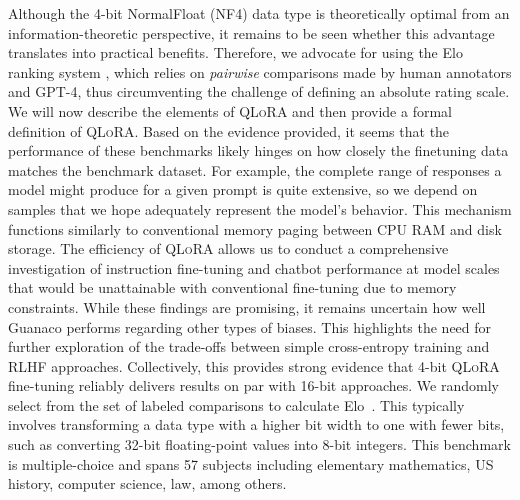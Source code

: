Although the 4-bit NormalFloat (NF4) data type is theoretically optimal from an information-theoretic perspective, it remains to be seen whether this advantage translates into practical benefits. Therefore, we advocate for using the Elo ranking system \citep{elo1967proposed}, which relies on \textit{pairwise} comparisons made by human annotators and GPT-4, thus circumventing the challenge of defining an absolute rating scale. We will now describe the elements of \textsc{QLoRA} and then provide a formal definition of \textsc{QLoRA}. Based on the evidence provided, it seems that the performance of these benchmarks likely hinges on how closely the finetuning data matches the benchmark dataset. For example, the complete range of responses a model might produce for a given prompt is quite extensive, so we depend on samples that we hope adequately represent the model's behavior. This mechanism functions similarly to conventional memory paging between CPU RAM and disk storage. The efficiency of \textsc{QLoRA} allows us to conduct a comprehensive investigation of instruction fine-tuning and chatbot performance at model scales that would be unattainable with conventional fine-tuning due to memory constraints. While these findings are promising, it remains uncertain how well {Guanaco} performs regarding other types of biases. This highlights the need for further exploration of the trade-offs between simple cross-entropy training and RLHF approaches. Collectively, this provides strong evidence that 4-bit \textsc{QLoRA} fine-tuning reliably delivers results on par with 16-bit approaches. We randomly select from the set of labeled comparisons to calculate Elo~\citep{elo1967proposed,elo1978rating}. This typically involves transforming a data type with a higher bit width to one with fewer bits, such as converting 32-bit floating-point values into 8-bit integers. This benchmark is multiple-choice and spans 57 subjects including elementary mathematics, US history, computer science, law, among others. \\ \\
